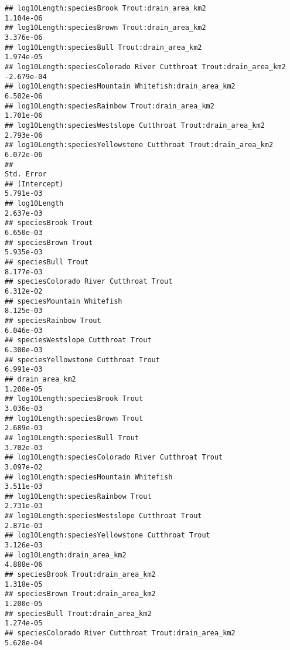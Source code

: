 \documentclass[
  landscape]{article}
\begin{document}
\begin{verbatim}
## log10Length:speciesBrook Trout:drain_area_km2                     1.104e-06
## log10Length:speciesBrown Trout:drain_area_km2                     3.376e-06
## log10Length:speciesBull Trout:drain_area_km2                      1.974e-05
## log10Length:speciesColorado River Cutthroat Trout:drain_area_km2 -2.679e-04
## log10Length:speciesMountain Whitefish:drain_area_km2              6.502e-06
## log10Length:speciesRainbow Trout:drain_area_km2                   1.701e-06
## log10Length:speciesWestslope Cutthroat Trout:drain_area_km2       2.793e-06
## log10Length:speciesYellowstone Cutthroat Trout:drain_area_km2     6.072e-06
##                                                                  Std. Error
## (Intercept)                                                       5.791e-03
## log10Length                                                       2.637e-03
## speciesBrook Trout                                                6.650e-03
## speciesBrown Trout                                                5.935e-03
## speciesBull Trout                                                 8.177e-03
## speciesColorado River Cutthroat Trout                             6.312e-02
## speciesMountain Whitefish                                         8.125e-03
## speciesRainbow Trout                                              6.046e-03
## speciesWestslope Cutthroat Trout                                  6.300e-03
## speciesYellowstone Cutthroat Trout                                6.991e-03
## drain_area_km2                                                    1.200e-05
## log10Length:speciesBrook Trout                                    3.036e-03
## log10Length:speciesBrown Trout                                    2.689e-03
## log10Length:speciesBull Trout                                     3.702e-03
## log10Length:speciesColorado River Cutthroat Trout                 3.097e-02
## log10Length:speciesMountain Whitefish                             3.511e-03
## log10Length:speciesRainbow Trout                                  2.731e-03
## log10Length:speciesWestslope Cutthroat Trout                      2.871e-03
## log10Length:speciesYellowstone Cutthroat Trout                    3.126e-03
## log10Length:drain_area_km2                                        4.888e-06
## speciesBrook Trout:drain_area_km2                                 1.318e-05
## speciesBrown Trout:drain_area_km2                                 1.200e-05
## speciesBull Trout:drain_area_km2                                  1.274e-05
## speciesColorado River Cutthroat Trout:drain_area_km2              5.628e-04

\end{verbatim}
\end{document}
